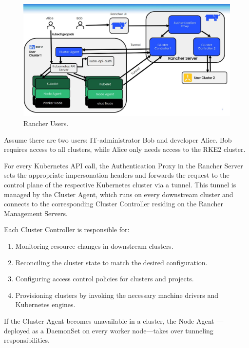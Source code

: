 \documentclass[../main.tex]{subfiles}
\begin{document}
\begin{figure}[H]
    \centering
    \includegraphics[scale=0.3]{img/3-background/rancher/rancher_users.png}
    \caption{Rancher Users. \protect\footnotemark}
    \label{fig:rancher_users}
\end{figure}


Assume there are two users: IT-administrator Bob and developer Alice. Bob requires access to all clusters, while Alice only needs access to the RKE2 cluster.

For every Kubernetes API call, the Authentication Proxy in the Rancher Server sets the appropriate impersonation headers and forwards the request to the control plane of the respective Kubernetes cluster via a tunnel. This tunnel is managed by the Cluster Agent, which runs on every downstream cluster and connects to the corresponding Cluster Controller residing on the Rancher Management Servers. 

Each Cluster Controller is responsible for:

\begin{enumerate}
    \item Monitoring resource changes in downstream clusters.
    \item Reconciling the cluster state to match the desired configuration.
    \item Configuring access control policies for clusters and projects.
    \item Provisioning clusters by invoking the necessary machine drivers and Kubernetes engines.
\end{enumerate}

If the Cluster Agent becomes unavailable in a cluster, the Node Agent — deployed as a DaemonSet on every worker node—takes over tunneling responsibilities.  
\end{document}

